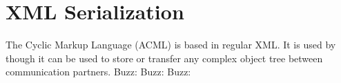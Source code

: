 \section{XML Serialization}
\label{feature:ACML}
\ClearAPI
The \AMBETH{} Cyclic Markup Language (ACML) is based in regular XML. It is used by  though it can be used to store or transfer any complex object tree between communication partners.
Buzz: 
Buzz: 
Buzz: 
\TODO